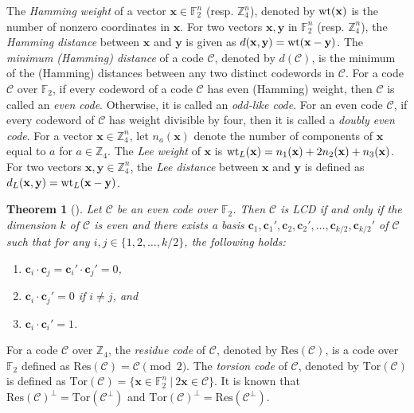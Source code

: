 \documentclass{article}
\newtheorem{theorem}{Theorem}[section]
\theoremstyle{definition}
\theoremstyle{remark}
\begin{document}
The \textit{Hamming weight} of a vector $\mathbf{x}\in\mathbb{F}_2^n$ (resp. $\mathbb{Z}_4^n$), denoted by ${\rm wt}(\mathbf{x})$ is the number of nonzero coordinates in $\mathbf{x}$. For two vectors $\mathbf{x}, \mathbf{y}$ in $\mathbb{F}_2^n$ (resp. $\mathbb{Z}_4^n$), the \textit{Hamming distance} between $\mathbf{x}$ and $\mathbf{y}$ is given as $d(\mathbf{x}, \mathbf{y})={\rm wt}(\mathbf{x}-\mathbf{y})$. The \textit{minimum (Hamming) distance} of a code $\mathcal{C}$, denoted by $d(\mathcal{C})$, is the minimum of the (Hamming) distances between any two distinct codewords in $\mathcal{C}$. For a code $\mathcal{C}$ over $\mathbb{F}_2$, if every codeword of a code $\mathcal{C}$ has even (Hamming) weight, then $\mathcal{C}$ is called an \textit{even code}. Otherwise, it is called an \textit{odd-like code}. For an even code $\mathcal{C}$, if every codeword of $\mathcal{C}$ has weight divisible by four, then it is called a \textit{doubly even code}. For a vector $\mathbf{x}\in\mathbb{Z}_4^n$, let $n_a(\mathbf{x})$ denote the number of components of $\mathbf{x}$ equal to $a$ for $a\in\mathbb{Z}_4$. The \textit{Lee weight} of $\mathbf{x}$ is ${\rm wt}_L(\mathbf{x})=n_1(\mathbf{x})+2n_2(\mathbf{x})+n_3(\mathbf{x})$. For two vectors $\mathbf{x}, \mathbf{y}\in\mathbb{Z}_4^n$, the \textit{Lee distance} between $\mathbf{x}$ and $\mathbf{y}$ is defined as $d_L(\mathbf{x}, \mathbf{y})={\rm wt}_L(\mathbf{x}-\mathbf{y})$.

\begin{theorem}[\cite{CMTQ-2018-1}]\label{LCDbasis}
Let $\mathcal{C}$ be an even code over $\mathbb{F}_2$. Then $\mathcal{C}$ is LCD if and only if the dimension $k$ of $\mathcal{C}$ is even and there exists a basis $\mathbf{c}_1, \mathbf{c}_1', \mathbf{c}_2, \mathbf{c}_2',\ldots, \mathbf{c}_{k/2}, \mathbf{c}_{k/2}'$ of $\mathcal{C}$ such that for any $i, j\in\{1, 2, \ldots, k/2\}$, the following holds:
\begin{enumerate}
    \item[(i)] $\mathbf{c}_i\cdot\mathbf{c}_j=\mathbf{c}_i'\cdot\mathbf{c}_j'=0$,
    \item[(ii)] $\mathbf{c}_i\cdot\mathbf{c}_j'=0$ if $i\ne j$, and
    \item[(iii)] $\mathbf{c}_i\cdot\mathbf{c}_i'=1$.
\end{enumerate}
\end{theorem}

For a code $\mathcal{C}$ over $\mathbb{Z}_4$, the \textit{residue code} of $\mathcal{C}$, denoted by $\text{Res}(\mathcal{C})$, is a code over $\mathbb{F}_2$ defined as $\text{Res}(\mathcal{C})=\mathcal{C}\pmod 2$. The \textit{torsion code} of $\mathcal{C}$, denoted by $\text{Tor}(\mathcal{C})$ is defined as $\text{Tor}(\mathcal{C})=\{\mathbf{x}\in\mathbb{F}_2^n~|~2\mathbf{x}\in\mathcal{C}\}$. It is known that $\text{Res}(\mathcal{C})^\perp=\text{Tor}(\mathcal{C}^\perp)$ and $\text{Tor}(\mathcal{C})^\perp=\text{Res}(\mathcal{C}^\perp)$.
\end{document}
